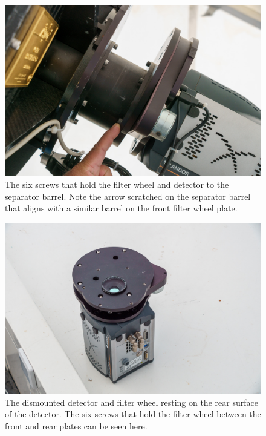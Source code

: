 \begin{figure}
\begin{center}
\includegraphics[width=0.8\linewidth]{figures/huitzi-mounting-screws.jpg}
\end{center}
\caption{The six screws that hold the filter wheel and detector to the separator barrel. Note the arrow scratched on the separator barrel that aligns with a similar barrel on the front filter wheel plate.}
\label{figure:huitzi-mounting-screws}
\end{figure}

\begin{figure}
\begin{center}
\includegraphics[width=0.8\linewidth]{figures/huitzi-off-telescope.jpg}
\end{center}
\caption{The dismounted detector and filter wheel resting on the rear surface of the detector. The six screws that hold the filter wheel between the front and rear plates can be seen here.}
\label{figure:huitzi-off-telescope}
\end{figure}

